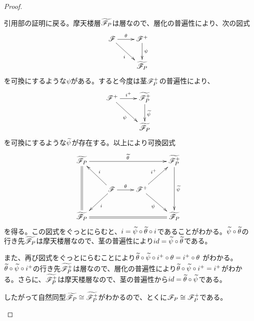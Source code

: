\begin{proof}
\begin{description}
    引用部の証明に戻る。摩天楼層$\widetilde{\mathscr{F}_P}$は層なので、層化の普遍性により、次の図式
    \[
    \xymatrix{
    \scrf \ar[r]^-{\grt} \ar[rd]_i & \scrf^+ \ar[d]^-{\psi} \\
    {} & \wt{\scrf_P}
    }
    \]
    を可換にするような$\psi$がある。すると今度は茎$\mathscr{F}^+_P$の普遍性により、
    \[
    \xymatrix{
    \scrf^+ \ar[r]^{i^+} \ar[rd]_{\psi} & \wt{\scrf^+_P} \ar[d]^{\wt{\psi}} \\
    {} & \wt{\scrf_P}
    }
    \]
    を可換にするような$\widetilde{\psi}$が存在する。以上により可換図式
    \[
    \xymatrix{
    \wt{\scrf_P} \ar[rrr]^-{\wt{\grt}} \ar@{=}[dd] & {} & {} & \wt{\scrf^+_P} \ar[dd]^-{\wt{\psi}} \\
    {} & \scrf \ar[r]^-{\grt} \ar[lu]_-i \ar[dl]^-i & \scrf^+ \ar[ru]^-{i^+} \ar[rd]_-{\psi} & {} \\
    \wt{\scrf_P} \ar@{=}[rrr] & {} & { } & \wt{\scrf_P}
    }
    \]
    を得る。この図式をぐっとにらむと、$i = \widetilde{\psi} \circ \widetilde{{\theta}} \circ i$であることがわかる。$\widetilde{\psi} \circ \widetilde{{\theta}}$の行き先$\widetilde{\mathscr{F}_P}$は摩天楼層なので、茎の普遍性により$id = \widetilde{\psi} \circ \widetilde{{\theta}}$である。

    また、再び図式をぐっとにらむことにより$\widetilde{{\theta}} \circ \widetilde{\psi} \circ i^+ \circ {\theta} = i^+ \circ {\theta}$
    がわかる。$\widetilde{{\theta}} \circ \widetilde{\psi} \circ i^+$の行き先$\widetilde{\mathscr{F}^+_P}$は層なので、層化の普遍性により$\widetilde{{\theta}} \circ \widetilde{\psi} \circ i^+ = i^+$がわかる。さらに、$\widetilde{\mathscr{F}^+_P}$は摩天楼層なので、茎の普遍性から$id = \widetilde{{\theta}} \circ \widetilde{\psi}$である。

    したがって自然同型$\widetilde{\mathscr{F}_P} \cong \widetilde{\mathscr{F}^+_P}$がわかるので、とくに$\mathscr{F}_P \cong \mathscr{F}^+_P$である。
\begin{comment}
    前半を示す。(層化の普遍性を使って示したいところだが、その方法は採らない。準備が足りないからである) 射$\grt \colon \scrf \to \scrf^+$は、すべての$P$の開近傍$U$について次の図式
\[
\xymatrix{
\scrf(U) \ar[r]^-{\grt_U} \ar[d] & \scrf^+(U) \ar[d] \\
\scrf_P \ar[r]^-{\grt_P} & \scrf^+_P
}
\]
    が可換になるような準同形$\grt_P \colon \scrf_P \to \scrf^+_P$を誘導する。また、準同形$\psi_U \colon \scrf^+(U) \to \scrf_P$を、$\psi_U(f)=f(P)$で定める。このときすべての$P$の開近傍の列$V \subset U$について次の図式
    \[
    \xymatrix{
    \scrf^+(U) \ar[r]^-{\psi_U} \ar[d] & \scrf_P  \\
    \scrf^+(V) \ar[ur]_-{\psi_V} & {}
    }
    \]
    は可換である。したがって茎の普遍性により、ある準同形$\wt{\psi}$が存在して、すべての$P$の開近傍$U$に対して次の図式
\[
\xymatrix{
\scrf^+(U) \ar[r]^-{\psi_U} \ar[d] & \scrf_P  \\
\scrf^+_P \ar[ur]_-{\wt{\psi}} & {}
}
\]
が可換になる。


\end{comment}
\end{description}
\end{proof}
